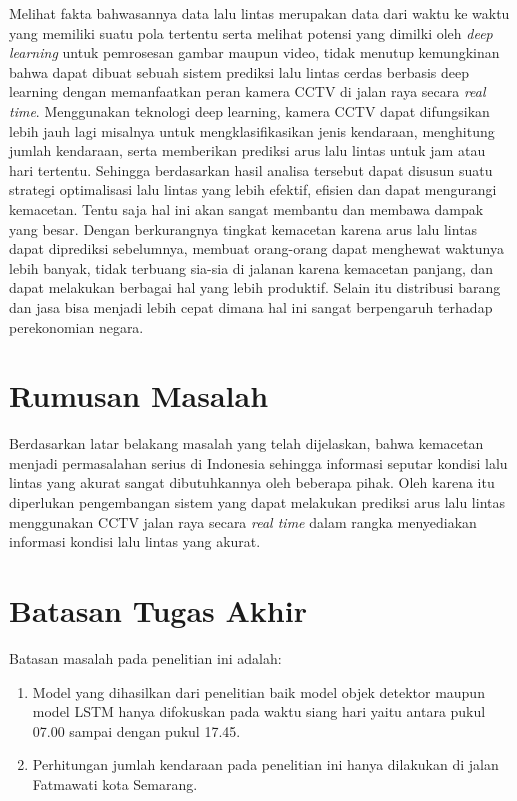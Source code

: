 \documentclass[../thesis.tex]{subfiles}
\begin{document}
Melihat fakta bahwasannya data lalu lintas merupakan data dari waktu ke waktu yang memiliki suatu pola tertentu serta melihat potensi yang dimilki oleh \textit{deep learning} untuk pemrosesan gambar maupun video, tidak menutup kemungkinan bahwa dapat dibuat sebuah sistem prediksi lalu lintas cerdas berbasis deep learning dengan memanfaatkan peran kamera CCTV di jalan raya secara \textit{real time}. 
Menggunakan teknologi deep learning, kamera CCTV dapat difungsikan lebih jauh lagi misalnya untuk mengklasifikasikan jenis kendaraan, menghitung jumlah kendaraan, serta memberikan prediksi arus lalu lintas untuk jam atau hari tertentu. Sehingga berdasarkan hasil analisa tersebut dapat disusun suatu strategi optimalisasi lalu lintas yang lebih efektif, efisien dan dapat mengurangi kemacetan. 
Tentu saja hal ini akan sangat membantu dan membawa dampak yang besar. Dengan berkurangnya tingkat kemacetan karena arus lalu lintas dapat diprediksi sebelumnya, membuat orang-orang dapat menghewat waktunya lebih banyak, tidak terbuang sia-sia di jalanan karena kemacetan panjang, dan dapat melakukan berbagai hal yang lebih produktif. 
Selain itu distribusi barang dan jasa bisa menjadi lebih cepat dimana hal ini sangat berpengaruh terhadap perekonomian negara. 

\section{Rumusan Masalah}
Berdasarkan latar belakang masalah yang telah dijelaskan, bahwa kemacetan menjadi permasalahan serius di Indonesia sehingga informasi seputar kondisi lalu lintas yang akurat sangat dibutuhkannya oleh beberapa pihak. Oleh karena itu diperlukan pengembangan sistem yang dapat melakukan prediksi arus lalu lintas menggunakan CCTV jalan raya secara \textit{real time} dalam rangka menyediakan informasi kondisi lalu lintas yang akurat. 

\section{Batasan Tugas Akhir}
Batasan masalah pada penelitian ini adalah:
\begin{enumerate}
    \item Model yang dihasilkan dari penelitian baik model objek detektor maupun model LSTM hanya difokuskan pada waktu siang hari yaitu antara pukul 07.00 sampai dengan pukul 17.45.
    \item Perhitungan jumlah kendaraan pada penelitian ini hanya dilakukan di jalan Fatmawati kota Semarang.
\end{enumerate}
\end{document}
